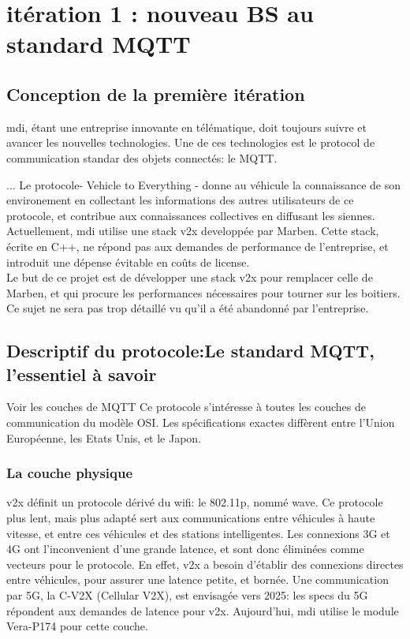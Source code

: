 \section{itération 1 : nouveau BS au standard MQTT}
    \subsection{Conception de la première itération}
        \gls{mdi}, étant une entreprise innovante en télématique, doit toujours
        suivre et avancer les nouvelles technologies. Une de ces technologies
        est le protocol de communication standar des objets connectés: le MQTT.

        ...
        Le protocole- Vehicle to Everything - donne au véhicule la
        connaissance de son environement en collectant les informations des autres
        utilisateurs de ce protocole, et contribue aux connaissances collectives en
        diffusant les siennes.\\[0.3cm]
        Actuellement, \gls{mdi} utilise une stack \gls{v2x} developpée par Marben\cite{marben_site}.
        Cette stack, écrite en C++, ne répond pas aux demandes de performance de
        l'entreprise, et introduit une dépense évitable en coûts de license.\\[0.3cm]
        Le but de ce projet est de développer une stack \gls{v2x} pour remplacer celle
        de Marben, et qui procure les performances nécessaires pour tourner sur les
        boitiers. Ce sujet ne sera pas trop détaillé vu qu'il a été abandonné par l'entreprise.


    \subsection{Descriptif du protocole:Le standard MQTT, l'essentiel à savoir}
        Voir les couches de MQTT
        Ce protocole s'intéresse à toutes les couches de communication du modèle OSI.
        Les spécifications exactes diffèrent entre l'Union Européenne, les Etats Unis,
        et le Japon.

        \subsubsection{La couche physique}
           v2x définit un protocole dérivé du wifi: le 802.11p, nommé \gls{wave}.
            Ce protocole plus lent, mais plus adapté sert aux communications entre
            véhicules à haute vitesse, et entre ces véhicules et des stations intelligentes.
            Les connexions 3G et 4G ont l'inconvenient d'une grande latence, et sont donc
            éliminées comme vecteurs pour le protocole. En effet, \gls{v2x} a besoin
            d'établir des connexions directes entre véhicules, pour assurer une latence
            petite, et bornée.
            Une communication par 5G, la C-V2X (Cellular V2X), est envisagée vers
            2025: les specs du 5G répondent aux demandes de latence pour \gls{v2x}.
            Aujourd'hui, \gls{mdi} utilise le module Vera-P174\cite{vera_doc}
            pour cette couche.


